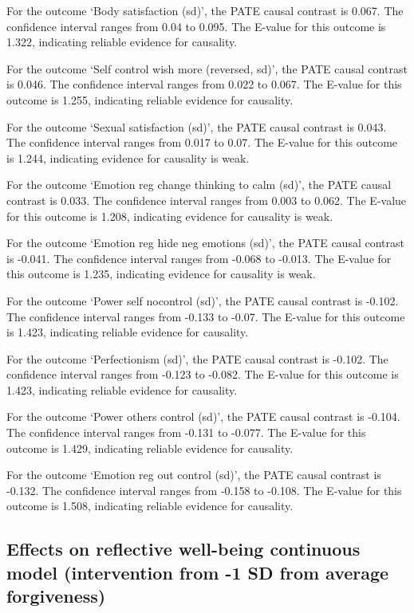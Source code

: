 \documentclass[
  singlecolumn]{report}
\begin{document}
For the outcome `Body satisfaction (sd)', the PATE causal contrast is
0.067. The confidence interval ranges from 0.04 to 0.095. The E-value
for this outcome is 1.322, indicating reliable evidence for causality.

For the outcome `Self control wish more (reversed, sd)', the PATE causal
contrast is 0.046. The confidence interval ranges from 0.022 to 0.067.
The E-value for this outcome is 1.255, indicating reliable evidence for
causality.

For the outcome `Sexual satisfaction (sd)', the PATE causal contrast is
0.043. The confidence interval ranges from 0.017 to 0.07. The E-value
for this outcome is 1.244, indicating evidence for causality is weak.

For the outcome `Emotion reg change thinking to calm (sd)', the PATE
causal contrast is 0.033. The confidence interval ranges from 0.003 to
0.062. The E-value for this outcome is 1.208, indicating evidence for
causality is weak.

For the outcome `Emotion reg hide neg emotions (sd)', the PATE causal
contrast is -0.041. The confidence interval ranges from -0.068 to
-0.013. The E-value for this outcome is 1.235, indicating evidence for
causality is weak.

For the outcome `Power self nocontrol (sd)', the PATE causal contrast is
-0.102. The confidence interval ranges from -0.133 to -0.07. The E-value
for this outcome is 1.423, indicating reliable evidence for causality.

For the outcome `Perfectionism (sd)', the PATE causal contrast is
-0.102. The confidence interval ranges from -0.123 to -0.082. The
E-value for this outcome is 1.423, indicating reliable evidence for
causality.

For the outcome `Power others control (sd)', the PATE causal contrast is
-0.104. The confidence interval ranges from -0.131 to -0.077. The
E-value for this outcome is 1.429, indicating reliable evidence for
causality.

For the outcome `Emotion reg out control (sd)', the PATE causal contrast
is -0.132. The confidence interval ranges from -0.158 to -0.108. The
E-value for this outcome is 1.508, indicating reliable evidence for
causality.

\hypertarget{effects-on-reflective-well-being-continuous-model-intervention-from--1-sd-from-average-forgiveness}{%
\subsection{Effects on reflective well-being continuous model
(intervention from -1 SD from average
forgiveness)}\label{effects-on-reflective-well-being-continuous-model-intervention-from--1-sd-from-average-forgiveness}}
\end{document}

